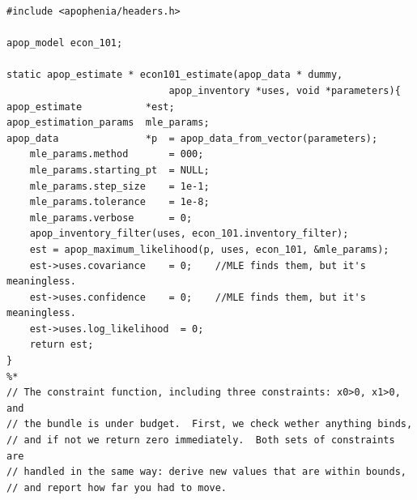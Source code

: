 \begin{lstlisting}
#include <apophenia/headers.h>

apop_model econ_101;

static apop_estimate * econ101_estimate(apop_data * dummy, 
                            apop_inventory *uses, void *parameters){
apop_estimate           *est;
apop_estimation_params  mle_params;
apop_data               *p  = apop_data_from_vector(parameters);
    mle_params.method       = 000;
    mle_params.starting_pt  = NULL;
    mle_params.step_size    = 1e-1;
    mle_params.tolerance    = 1e-8;
    mle_params.verbose      = 0;
    apop_inventory_filter(uses, econ_101.inventory_filter);
    est = apop_maximum_likelihood(p, uses, econ_101, &mle_params);
    est->uses.covariance    = 0;    //MLE finds them, but it's meaningless.
    est->uses.confidence    = 0;    //MLE finds them, but it's meaningless.
    est->uses.log_likelihood  = 0;
    return est;
}
%*
// The constraint function, including three constraints: x0>0, x1>0, and
// the bundle is under budget.  First, we check wether anything binds,
// and if not we return zero immediately.  Both sets of constraints are
// handled in the same way: derive new values that are within bounds,
// and report how far you had to move.


\end{lstlisting}
